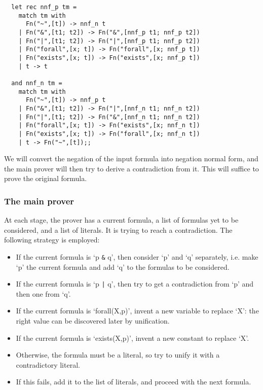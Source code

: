 \begin{boxed}\begin{lstlisting}
  let rec nnf_p tm =
    match tm with
      Fn("~",[t]) -> nnf_n t
    | Fn("&",[t1; t2]) -> Fn("&",[nnf_p t1; nnf_p t2])
    | Fn("|",[t1; t2]) -> Fn("|",[nnf_p t1; nnf_p t2])
    | Fn("forall",[x; t]) -> Fn("forall",[x; nnf_p t])
    | Fn("exists",[x; t]) -> Fn("exists",[x; nnf_p t])
    | t -> t

  and nnf_n tm =
    match tm with
      Fn("~",[t]) -> nnf_p t
    | Fn("&",[t1; t2]) -> Fn("|",[nnf_n t1; nnf_n t2])
    | Fn("|",[t1; t2]) -> Fn("&",[nnf_n t1; nnf_n t2])
    | Fn("forall",[x; t]) -> Fn("exists",[x; nnf_n t])
    | Fn("exists",[x; t]) -> Fn("forall",[x; nnf_n t])
    | t -> Fn("~",[t]);;
\end{lstlisting}\end{boxed}

We will convert the negation of the input formula into negation normal form,
and the main prover will then try to derive a contradiction from it. This will
suffice to prove the original formula.

\subsubsection*{The main prover}

At each stage, the prover has a current formula, a list of formulas yet to be
considered, and a list of literals. It is trying to reach a contradiction. The
following strategy is employed:

\begin{itemize}

\item If the current formula is `p {\verb+&+} q', then consider
`p' and `q' separately, i.e. make `p' the current formula and add
`q' to the formulas to be considered.

\item If the current formula is `p {\verb+|+} q', then try to get a
contradiction from `p' and then one from `q'.

\item If the current formula is `forall(X,p)', invent a new variable to
replace `X': the right value can be discovered later by unification.

\item If the current formula is `exists(X,p)', invent a new constant to
replace `X'.

\item Otherwise, the formula must be a literal, so try to unify it with a
contradictory literal.

\item If this fails, add it to the list of literals, and proceed with the next
formula.

\end{itemize}

